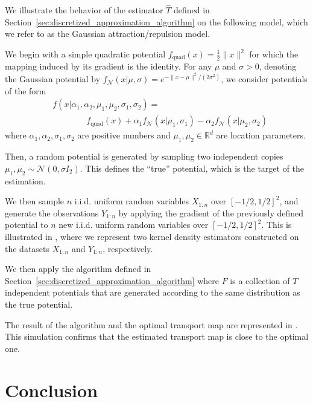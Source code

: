 \documentclass{article}
\theoremstyle{plain}
\theoremstyle{definition}
\theoremstyle{remark}
\newcommand{\R}[0]{\mathbb{R}}
\begin{document}
We illustrate the behavior of the estimator $\hat{T}$ defined in Section~\ref{sec:discretized_approximation_algorithm} on the following model, which we refer to as the Gaussian attraction/repulsion model.

We begin with a simple quadratic potential $f_{\text{quad}}(x) = \frac{1}{2} \| x \|^2$ for which the mapping induced by its gradient is the identity. 
For any $\mu$ and $\sigma > 0$, denoting the Gaussian potential by $f_{\mathcal{N}}(x| \mu, \sigma) = e^{ - \| x - \mu \|^2 / (2 \sigma^2)}$, we consider potentials of the form 
\begin{equation}
\begin{aligned}
    &f(x | \alpha_1, \alpha_2, \mu_1, \mu_2, \sigma_1, \sigma_2 ) = \\
    &\qquad\qquad f_{\text{quad}}(x) + \alpha_1 f_{\mathcal{N}}(x| \mu_1, \sigma_1) - \alpha_2 f_{\mathcal{N}}(x| \mu_2, \sigma_2)
\end{aligned}
\end{equation}
where $\alpha_1, \alpha_2, \sigma_1, \sigma_2$ are positive numbers and $\mu_1, \mu_2 \in \R^d$ are location parameters. 

Then, a random potential is generated by sampling two independent copies $\mu_1, \mu_2 \sim \mathcal{N}(0, \sigma I_2)$. 
This defines the ``true'' potential, which is the target of the estimation. 

We then sample $n$ i.i.d. uniform random variables $X_{1:n}$ over $[-1/2, 1/2]^2$, and generate the observations $Y_{1:n}$ by applying the gradient of the previously defined potential to $n$ new i.i.d. uniform random variables over $[-1/2, 1/2]^2$. 
This is illustrated in , where we represent two kernel density estimators constructed on the datasets $X_{1:n}$ and $Y_{1:n}$, respectively. 

We then apply the algorithm defined in Section~\ref{sec:discretized_approximation_algorithm} where $F$ is a collection of $T$ independent potentials that are generated according to the same distribution as the true potential. 

The result of the algorithm and the optimal transport map are represented in . 
This simulation confirms that the estimated transport map is close to the optimal one.


\section{Conclusion}
\label{sec:conclusion}
\end{document}

